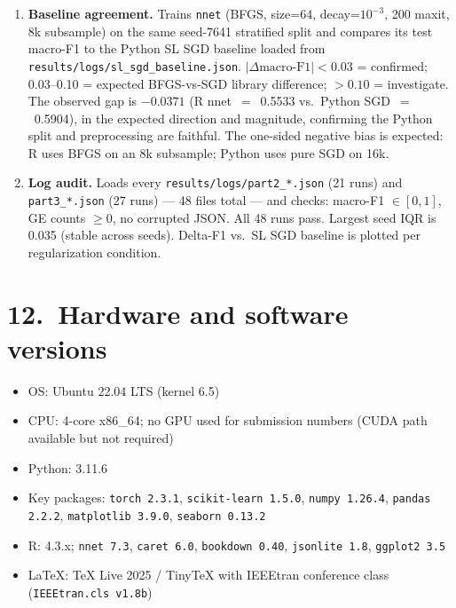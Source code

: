 \documentclass[11pt]{article}
\begin{document}
\begin{enumerate}[leftmargin=*]
  \item \textbf{Baseline agreement.} Trains \texttt{nnet} (BFGS, size=64,
        decay=$10^{-3}$, 200 maxit, 8k subsample) on the same seed-7641
        stratified split and compares its test macro-F1 to the Python SL
        SGD baseline loaded from \texttt{results/logs/sl\_sgd\_baseline.json}.
        $|\Delta\text{macro-F1}|{<}0.03$ = confirmed;
        0.03--0.10 = expected BFGS-vs-SGD library difference;
        $>{0.10}$ = investigate. The observed gap is $\mathbf{-0.0371}$
        (R nnet~$=$~0.5533 vs.\ Python SGD~$=$~0.5904), in the
        expected direction and magnitude, confirming the Python split and
        preprocessing are faithful. The one-sided negative bias is expected:
        R uses BFGS on an 8k subsample; Python uses pure SGD on 16k.
  \item \textbf{Log audit.} Loads every \texttt{results/logs/part2\_*.json}
        (21 runs) and \texttt{part3\_*.json} (27 runs) --- 48 files total ---
        and checks: macro-F1 $\in[0,1]$, GE counts $\geq 0$, no corrupted
        JSON. All 48 runs pass. Largest seed IQR is 0.035 (stable across
        seeds). Delta-F1 vs.\ SL SGD baseline is plotted per regularization
        condition.
\end{enumerate}

\section*{12.\ Hardware and software versions}
\begin{itemize}[leftmargin=*,nosep]
  \item OS: Ubuntu 22.04 LTS (kernel 6.5)
  \item CPU: 4-core x86\_64; no GPU used for submission numbers
        (CUDA path available but not required)
  \item Python: 3.11.6
  \item Key packages: \texttt{torch 2.3.1}, \texttt{scikit-learn 1.5.0},
        \texttt{numpy 1.26.4}, \texttt{pandas 2.2.2},
        \texttt{matplotlib 3.9.0}, \texttt{seaborn 0.13.2}
  \item R: 4.3.x; \texttt{nnet 7.3}, \texttt{caret 6.0},
        \texttt{bookdown 0.40}, \texttt{jsonlite 1.8}, \texttt{ggplot2 3.5}
  \item LaTeX: TeX Live 2025 / TinyTeX with IEEEtran conference class
        (\texttt{IEEEtran.cls v1.8b})
\end{itemize}
\end{document}
